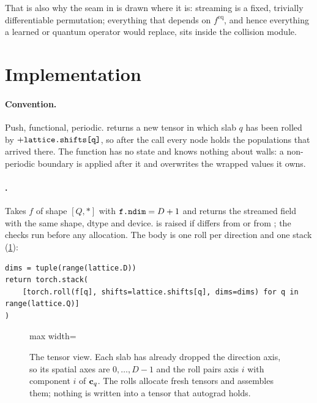 That is also why the seam in  is drawn where it is: streaming is a fixed,
trivially differentiable permutation; everything that depends on $f^{\mathrm{eq}}$, and
hence everything a learned or quantum operator would replace, sits inside the collision
module.


\section{Implementation}\label{sec:stream-impl}

\paragraph{Convention.}
Push, functional, periodic.  returns a new tensor in which slab $q$
has been rolled by $+\texttt{lattice.shifts[q]}$, so after the call every node holds the
populations that arrived there. The function has no state and knows nothing about walls: a
non-periodic boundary is applied after it and overwrites the wrapped values it owns.

\paragraph{.}
Takes $f$ of shape $[Q, \ast]$ with $\texttt{f.ndim} = D + 1$ and returns the streamed field
with the same shape, dtype and device.  is raised if 
differs from  or  from ; the checks run
before any allocation. The body is one roll per direction and one stack
(\cref{fig:tensor}):
\begin{lstlisting}[style=py]
dims = tuple(range(lattice.D))
return torch.stack(
    [torch.roll(f[q], shifts=lattice.shifts[q], dims=dims) for q in range(lattice.Q)]
)
\end{lstlisting}

\begin{figure}[h]
\centering
\begin{adjustbox}{max width=\linewidth}\end{adjustbox}
\caption{The tensor view. Each slab  has already dropped the direction axis, so
its spatial axes are $0,\dots,D-1$ and the roll pairs axis $i$ with component $i$ of
$\mathbf{c}_q$. The rolls allocate fresh tensors and  assembles them; nothing is
written into a tensor that autograd holds.}
\label{fig:tensor}
\end{figure}

